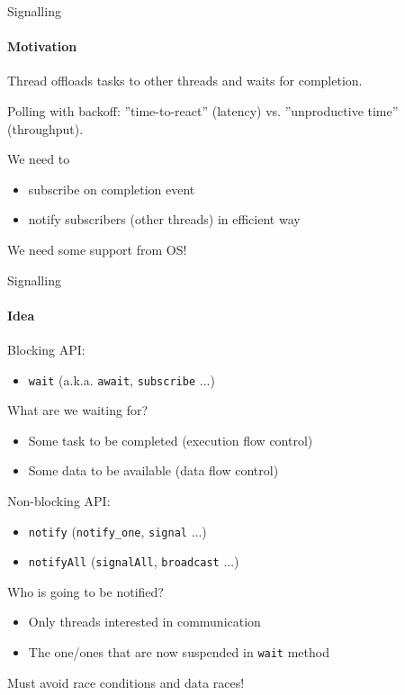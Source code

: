 \begin{frame}{Signalling}
\framesubtitle{Motivation}

Thread offloads tasks to other threads and waits for completion.

Polling with backoff: ''time-to-react'' (latency) vs. ''unproductive time'' (throughput).

\pause
We need to
\begin{itemize}
 \item subscribe on completion event
 \item notify subscribers (other threads) in efficient way
\end{itemize}

We need some support from OS!
\end{frame}


\begin{frame}{Signalling}
\framesubtitle{Idea}

Blocking API:
\begin{itemize}
    \item \texttt{wait} (a.k.a. \texttt{await}, \texttt{subscribe} ...)
\end{itemize}

\pause
What are we waiting for?

\begin{itemize}
 \item Some task to be completed (execution flow control)
 \item Some data to be available (data flow control)
\end{itemize}

\pause

Non-blocking API:
\begin{itemize}
    \item \texttt{notify} (\texttt{notify\_one}, \texttt{signal} ...)
    \item \texttt{notifyAll} (\texttt{signalAll}, \texttt{broadcast} ...)
\end{itemize}

\pause
Who is going to be notified?

\pause
\begin{itemize}
    \item Only threads interested in communication
    \item The one/ones that are now suspended in \texttt{wait} method
\end{itemize}

\pause

Must avoid race conditions and data races!
\end{frame}

